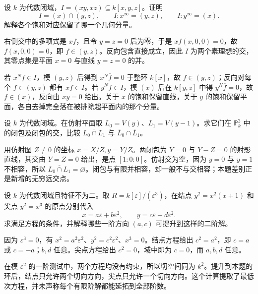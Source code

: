 \begin{exercise}\label{g5:ex:saturation-components}
	设 \(k\) 为代数闭域，\(I=(xy,xz)\subseteq k[x,y,z]\)。证明
	\[
		I=(x)\cap(y,z),\qquad
		I:x^\infty=(y,z),\qquad I:y^\infty=(x).
	\]
	解释各个饱和对应保留了哪一个几何分量。
\end{exercise}
\begin{solution}
	右侧交中的多项式是 \(xf\)，且令 \(y=z=0\) 后为零，于是 \(xf(x,0,0)=0\)，故 \(f(x,0,0)=0\)，即 \(f\in(y,z)\)。反向包含直接成立，因此 \(I\) 为两个素理想的交，其零点集是平面 \(x=0\) 与直线 \(y=z=0\) 的并。

	若 \(x^Nf\in I\)，模 \((y,z)\) 后得到 \(x^N\overline f=0\) 于整环 \(k[x]\)，故 \(f\in(y,z)\)；反向对每个 \(f\in(y,z)\) 都有 \(xf\in I\)。若 \(y^Nf\in I\)，模 \((x)\) 后在 \(k[y,z]\) 中得 \(y^N\overline f=0\)，故 \(f\in(x)\)，反向由 \(xy=0\) 给出。关于 \(x\) 的饱和保留直线，关于 \(y\) 的饱和保留平面，各自去掉完全落在被排除超平面内的那个分量。
\end{solution}

\begin{exercise}\label{g5:ex:closure-intersection}
	设 \(k\) 为代数闭域。在仿射平面取 \(L_0=V(y)\)、\(L_1=V(y-1)\)。求它们在 \(\mathbb P_k^2\) 中的闭包及闭包的交，比较 \(\overline{L_0\cap L_1}\) 与 \(\overline L_0\cap\overline L_1\)。
\end{exercise}
\begin{solution}
	用仿射图 \(Z\ne0\) 的坐标 \(x=X/Z,y=Y/Z\)。两闭包为 \(Y=0\) 与 \(Y-Z=0\) 的射影直线，其交由 \(Y=Z=0\) 给出，是点 \([1:0:0]\)。仿射交为空，因为 \(y=0\) 与 \(y=1\) 不相容，所以 \(\overline{L_0\cap L_1}=\varnothing\)。闭包与有限并相容，却一般不与交相容；本题差别正是新增的无穷远交点。
\end{solution}

\begin{exercise}\label{g5:ex:second-order-directions}
	设 \(k\) 为代数闭域且特征不为二。取 \(R=k[\varepsilon]/(\varepsilon^3)\)，在结点 \(y^2=x^2(x+1)\) 和尖点 \(y^2=x^3\) 的原点分别代入
	\[
		x=a\varepsilon+b\varepsilon^2,\qquad
		y=c\varepsilon+d\varepsilon^2.
	\]
	求满足方程的条件，并解释哪些一阶方向 \((a,c)\) 可提升到这样的二阶解。
\end{exercise}
\begin{solution}
	因为 \(\varepsilon^3=0\)，有 \(x^2=a^2\varepsilon^2\)、\(y^2=c^2\varepsilon^2\)、\(x^3=0\)。结点方程给出 \(c^2=a^2\)，即 \(c=a\) 或 \(c=-a\)；\(b,d\) 任意。尖点方程给出 \(c^2=0\)，域中即为 \(c=0\)，而 \(a,b,d\) 任意。

	在模 \(\varepsilon^2\) 的一阶测试中，两个方程均没有约束，所以切空间同为 \(k^2\)。提升到本题的环后，结点只允许两个切向方向，尖点只允许一个切向方向。这个计算提取了最低次方程，并未声称每个有限阶解都能延拓到全部阶数。
\end{solution}

